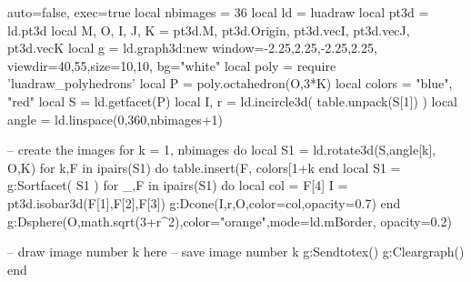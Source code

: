 \documentclass[tikz]{standalone} %
\begin{document}
\begin{luadraw}{auto=false, exec=true}
local nbimages = 36
local ld = luadraw
local pt3d = ld.pt3d
local M, O, I, J, K = pt3d.M, pt3d.Origin,  pt3d.vecI, pt3d.vecJ, pt3d.vecK
local g = ld.graph3d:new{ window={-2.25,2.25,-2.25,2.25}, viewdir={40,55},size={10,10}, bg="white"}
local poly = require 'luadraw_polyhedrons'
local P = poly.octahedron(O,3*K)
local colors = {"blue", "red"}
local S = ld.getfacet(P)
local I, r = ld.incircle3d( table.unpack(S[1]) )
local angle = ld.linspace(0,360,nbimages+1)

-- create the images
for k = 1, nbimages do 
    local  S1 = ld.rotate3d(S,angle[k], {O,K}) 
    for k,F in ipairs(S1) do
        table.insert(F, colors[1+k%
    end
    local S1 = g:Sortfacet( S1 )
    for _,F in ipairs(S1) do
        local col = F[4]
        I = pt3d.isobar3d({F[1],F[2],F[3]})
        g:Dcone(I,r,O,{color=col,opacity=0.7})
    end
    g:Dsphere(O,math.sqrt(3+r^2),{color="orange",mode=ld.mBorder, opacity=0.2})

    -- draw image number k here
    -- save image number k
    g:Sendtotex()
    g:Cleargraph()
end
\end{luadraw}
\end{document}
